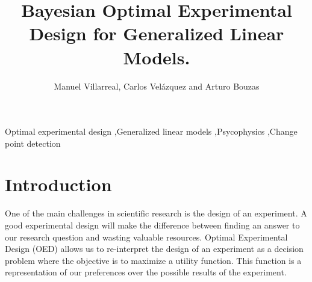 \documentclass[preprint,review,12pt]{elsarticle}
\begin{document}
\begin{frontmatter}


\title{Bayesian Optimal Experimental Design for Generalized Linear Models.}




\author{Manuel Villarreal, Carlos Vel\'{a}zquez and Arturo Bouzas}

\address{Mexico City, Mexico}

\begin{abstract}
\end{abstract}

\begin{keyword}
Optimal experimental design \sep Generalized linear models \sep Psycophysics \sep Change point detection


\end{keyword}

\end{frontmatter}

\linenumbers

\section{Introduction}
\label{S:1}

One of the main challenges in scientific research is the design of an experiment. A good experimental design will make the difference between finding an answer to our research question and wasting valuable resources. Optimal Experimental Design (OED) allows us to re-interpret the design of an experiment as a decision problem where the objective is to maximize a utility function. This function is a representation of our preferences over the possible results of the experiment.
\end{document}
